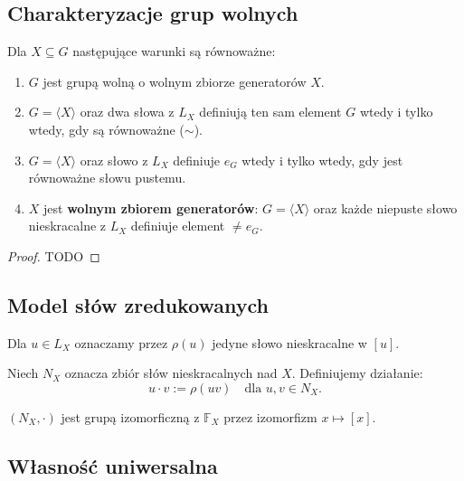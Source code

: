\subsection*{Charakteryzacje grup wolnych}

\begin{theorem}
    Dla $X \subseteq G$ następujące warunki są równoważne:
    \begin{enumerate}[label=\arabic*)]
        \item $G$ jest grupą wolną o wolnym zbiorze generatorów $X$.
        \item $G = \langle X \rangle$ oraz dwa słowa z $L_X$ definiują ten sam element $G$ wtedy i tylko wtedy, gdy są równoważne ($\sim$).
        \item $G = \langle X \rangle$ oraz słowo z $L_X$ definiuje $e_G$ wtedy i tylko wtedy, gdy jest równoważne słowu pustemu.
        \item $X$ jest \textbf{wolnym zbiorem generatorów}: $G = \langle X \rangle$ oraz każde niepuste słowo nieskracalne z $L_X$ definiuje element $\neq e_G$.
    \end{enumerate}
\end{theorem}
\begin{proof}
    TODO
\end{proof} 


\subsection*{Model słów zredukowanych}

\begin{definition}
    Dla $u \in L_X$ oznaczamy przez $\rho(u)$ jedyne słowo nieskracalne w $[u]$.
\end{definition}

\begin{definition}[Grupa $N_X$]
    Niech $N_X$ oznacza zbiór słów nieskracalnych nad $X$. Definiujemy działanie:
    \[
    u \cdot v := \rho(uv) \quad \text{dla } u, v \in N_X.
    \]
\end{definition}

\begin{fact}
    $(N_X, \cdot)$ jest grupą izomorficzną z $\mathbb{F}_X$ przez izomorfizm $x \mapsto [x]$.
\end{fact}

\subsection*{Własność uniwersalna}

